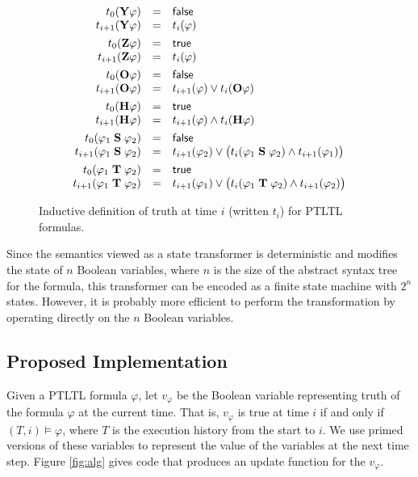 \documentclass{article}
\newcommand{\ltlform}{\varphi}
\newcommand{\ltlY}{\mathbf{Y}}
\newcommand{\ltlZ}{\mathbf{Z}}
\newcommand{\ltlO}{\mathbf{O}}
\newcommand{\ltlH}{\mathbf{H}}
\newcommand{\ltlS}{\mathrel{\mathbf{S}}}
\newcommand{\ltlT}{\mathrel{\mathbf{T}}}
\begin{document}
\begin{figure}
\[
\begin{array}{rcl}
t_0(\ltlY \ltlform) & = & \false\\
t_{i+1}(\ltlY \ltlform) & = & t_i(\ltlform)\\
\\[-0.8em]
t_0(\ltlZ \ltlform) & = & \true\\
t_{i+1}(\ltlZ \ltlform) & = & t_i(\ltlform)\\
\\[-0.8em]
t_0(\ltlO \ltlform) & = & \false\\
t_{i+1}(\ltlO \ltlform) & = & t_{i+1}(\ltlform) \vee t_i(\ltlO \ltlform)\\
\\[-0.8em]
t_0(\ltlH \ltlform) & = & \true\\
t_{i+1}(\ltlH \ltlform) & = & t_{i+1}(\ltlform) \wedge t_i(\ltlH \ltlform)\\
\\[-0.8em]
t_0(\ltlform_1 \ltlS \ltlform_2) & = & \false\\
t_{i+1}(\ltlform_1 \ltlS \ltlform_2) & = & t_{i+1}(\ltlform_2) \vee \bigl(t_i(\ltlform_1 \ltlS \ltlform_2) \wedge t_{i+1}(\ltlform_1)\bigr)\\
\\[-0.8em]
t_0(\ltlform_1 \ltlT \ltlform_2) & = & \true\\
t_{i+1}(\ltlform_1 \ltlT \ltlform_2) & = & t_{i+1}(\ltlform_1) \vee \bigl(t_i(\ltlform_1 \ltlT \ltlform_2) \wedge t_{i+1}(\ltlform_2)\bigr)\\
\end{array}
\]
\caption{\label{fig:inductive-semantics}Inductive definition of truth at time $i$ (written $t_i$) for PTLTL formulas.}
\end{figure}

Since the semantics viewed as a state transformer is deterministic and modifies the state of $n$ Boolean variables, where $n$ is the size of the abstract syntax tree for the formula, this transformer can be encoded as a finite state machine with $2^n$ states.  However, it is probably more efficient to perform the transformation by operating directly on the $n$ Boolean variables.

\subsection{Proposed Implementation}

Given a PTLTL formula $\ltlform$, let $v_\ltlform$ be the Boolean variable representing truth of the formula $\ltlform$ at the current time.  That is, $v_\ltlform$ is true at time $i$ if and only if $(T,i) \models \ltlform$, where $T$ is the execution history from the start to $i$.  
We use primed versions of these variables to represent the value of the variables at the next time step.  Figure \ref{fig:alg} gives code that produces an update function for the $v_\ltlform$.
\end{document}
